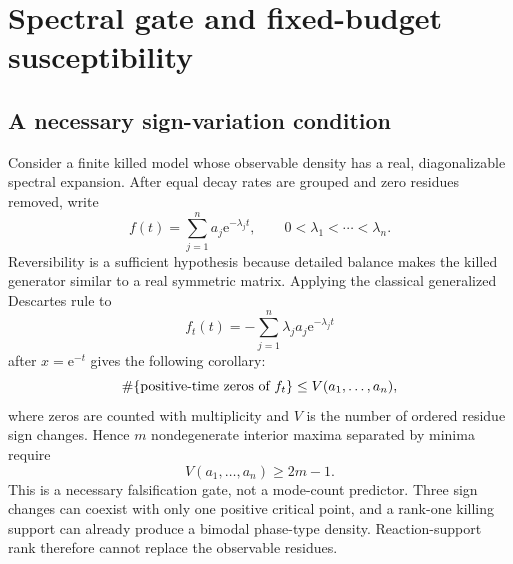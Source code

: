 \documentclass[aps,pre,reprint,amsmath,amssymb,longbibliography,floatfix]{revtex4-2}
\newcommand{\e}{\mathrm e}
\begin{document}
\section{Spectral gate and fixed-budget susceptibility}
\label{sec:modality-design}

\subsection{A necessary sign-variation condition}
\label{sec:spectral-bound}

Consider a finite killed model whose observable density has a real,
diagonalizable spectral expansion. After equal decay rates are grouped and
zero residues removed, write
\begin{equation}
f(t)=\sum_{j=1}^{n}a_j\e^{-\lambda_jt},
\qquad 0<\lambda_1<\cdots<\lambda_n.
\label{eq:spectral-density}
\end{equation}
Reversibility is a sufficient hypothesis because detailed balance makes the
killed generator similar to a real symmetric matrix. Applying the classical
generalized Descartes rule \cite{jameson2006descartes} to
\begin{equation}
f_t(t)=-\sum_{j=1}^{n}\lambda_ja_j\e^{-\lambda_jt}
\label{eq:spectral-derivative}
\end{equation}
after \(x=\e^{-t}\) gives the following corollary:
\[
\#\{\hbox{positive-time zeros of }f_t\}
\leq V(a_1,\ldots,a_n),
\]
where zeros are counted with multiplicity and \(V\) is the number of ordered
residue sign changes. Hence \(m\) nondegenerate interior maxima separated by
minima require
\begin{equation}
V(a_1,\ldots,a_n)\geq2m-1.
\label{eq:spectral-mode-bound}
\end{equation}
This is a necessary falsification gate, not a mode-count predictor. Three
sign changes can coexist with only one positive critical point, and a
rank-one killing support can already produce a bimodal phase-type density.
Reaction-support rank therefore cannot replace the observable residues.
\end{document}
